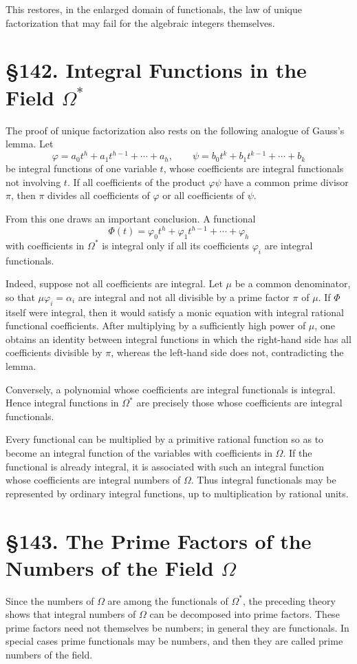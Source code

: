 \documentclass[11pt,a4paper]{book}
\newcommand{\webersection}[2]{\clearpage\section*{\S #1. #2}}
\begin{document}
This restores, in the enlarged domain of functionals, the law of unique factorization that may fail for the algebraic integers themselves.

\webersection{142}{Integral Functions in the Field \(\Omega^*\)}

The proof of unique factorization also rests on the following analogue of Gauss's lemma.  Let
\[
 \varphi=a_0t^h+a_1t^{h-1}+\cdots+a_h,
\qquad
 \psi=b_0t^k+b_1t^{k-1}+\cdots+b_k
\]
be integral functions of one variable \(t\), whose coefficients are integral functionals not involving \(t\).  If all coefficients of the product \(\varphi\psi\) have a common prime divisor \(\pi\), then \(\pi\) divides all coefficients of \(\varphi\) or all coefficients of \(\psi\).

From this one draws an important conclusion.  A functional
\begin{equation}
 \Phi(t)=\varphi_0t^h+\varphi_1t^{h-1}+\cdots+
\varphi_h \tag{1}
\end{equation}
with coefficients in \(\Omega^*\) is integral only if all its coefficients \(\varphi_i\) are integral functionals.

Indeed, suppose not all coefficients are integral.  Let \(\mu\) be a common denominator, so that \(\mu\varphi_i=\alpha_i\) are integral and not all divisible by a prime factor \(\pi\) of \(\mu\).  If \(\Phi\) itself were integral, then it would satisfy a monic equation with integral rational functional coefficients.  After multiplying by a sufficiently high power of \(\mu\), one obtains an identity between integral functions in which the right-hand side has all coefficients divisible by \(\pi\), whereas the left-hand side does not, contradicting the lemma.

Conversely, a polynomial whose coefficients are integral functionals is integral.  Hence integral functions in \(\Omega^*\) are precisely those whose coefficients are integral functionals.

Every functional can be multiplied by a primitive rational function so as to become an integral function of the variables with coefficients in \(\Omega\).  If the functional is already integral, it is associated with such an integral function whose coefficients are integral numbers of \(\Omega\).  Thus integral functionals may be represented by ordinary integral functions, up to multiplication by rational units.

\webersection{143}{The Prime Factors of the Numbers of the Field \(\Omega\)}

Since the numbers of \(\Omega\) are among the functionals of \(\Omega^*\), the preceding theory shows that integral numbers of \(\Omega\) can be decomposed into prime factors.  These prime factors need not themselves be numbers; in general they are functionals.  In special cases prime functionals may be numbers, and then they are called prime numbers of the field.
\end{document}
